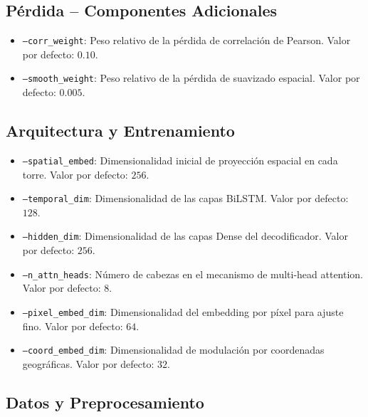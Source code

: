 \subsection*{Pérdida -- Componentes Adicionales}

\begin{itemize}
    \item \texttt{--corr\_weight}: Peso relativo de la pérdida de correlación de Pearson. Valor por defecto: $0.10$.
    
    \item \texttt{--smooth\_weight}: Peso relativo de la pérdida de suavizado espacial. Valor por defecto: $0.005$.
\end{itemize}

\subsection*{Arquitectura y Entrenamiento}

\begin{itemize}
    \item \texttt{--spatial\_embed}: Dimensionalidad inicial de proyección espacial en cada torre. Valor por defecto: $256$.
    
    \item \texttt{--temporal\_dim}: Dimensionalidad de las capas BiLSTM. Valor por defecto: $128$.
    
    \item \texttt{--hidden\_dim}: Dimensionalidad de las capas Dense del decodificador. Valor por defecto: $256$.
    
    \item \texttt{--n\_attn\_heads}: Número de cabezas en el mecanismo de multi-head attention. Valor por defecto: $8$.
    
    \item \texttt{--pixel\_embed\_dim}: Dimensionalidad del embedding por píxel para ajuste fino. Valor por defecto: $64$.
    
    \item \texttt{--coord\_embed\_dim}: Dimensionalidad de modulación por coordenadas geográficas. Valor por defecto: $32$.
\end{itemize}

\subsection*{Datos y Preprocesamiento}

